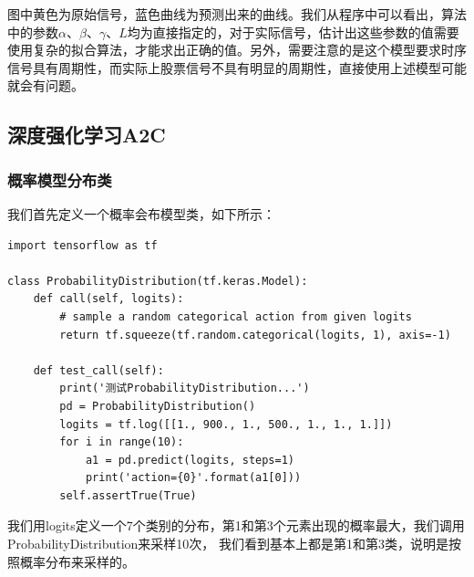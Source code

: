 \documentclass{article}
\begin{document}
图中黄色为原始信号，蓝色曲线为预测出来的曲线。我们从程序中可以看出，算法中的参数$\alpha$、$\beta$、$\gamma$、$L$均为直接指定的，对于实际信号，估计出这些参数的值需要使用复杂的拟合算法，才能求出正确的值。另外，需要注意的是这个模型要求时序信号具有周期性，而实际上股票信号不具有明显的周期性，直接使用上述模型可能就会有问题。


\subsection{深度强化学习A2C}
\subsubsection{概率模型分布类}
我们首先定义一个概率会布模型类，如下所示：
\begin{lstlisting}
import tensorflow as tf

class ProbabilityDistribution(tf.keras.Model):
    def call(self, logits):
        # sample a random categorical action from given logits
        return tf.squeeze(tf.random.categorical(logits, 1), axis=-1)

    def test_call(self):
        print('测试ProbabilityDistribution...')
        pd = ProbabilityDistribution()
        logits = tf.log([[1., 900., 1., 500., 1., 1., 1.]])
        for i in range(10):
            a1 = pd.predict(logits, steps=1)
            print('action={0}'.format(a1[0]))
        self.assertTrue(True)
\end{lstlisting}
我们用logits定义一个7个类别的分布，第1和第3个元素出现的概率最大，我们调用ProbabilityDistribution来采样10次，
我们看到基本上都是第1和第3类，说明是按照概率分布来采样的。
\end{document}
